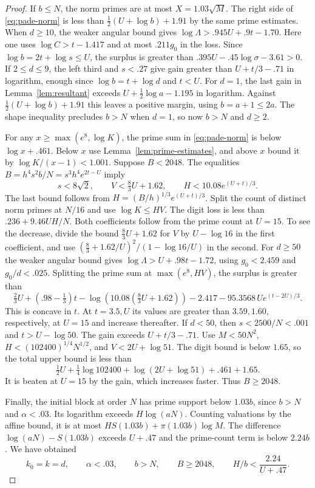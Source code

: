 \begin{proof}
If \(b\le N\), the norm primes are at most \(X=1.03\sqrt M\).
The right side of \eqref{eq:pade-norm} is less than
\(\tfrac12(U+\log b)+1.91\) by the same prime estimates.
When \(d\ge10\), the weaker angular bound gives
\(\log\Lambda>.945U+.9t-1.70\). Here one uses
\(\log C>t-1.417\) and at most \(.211g_0\) in the loss.
Since \(\log b=2t+\log s\le U\), the surplus is greater than
\(.395U-.45\log\sigma-3.61>0\).
If \(2\le d\le9\), the left third and \(s<.27\) give gain
greater than \(U+t/3-.71\) in logarithm, enough since
\(\log b=t+\log d\) and \(t<U\).
For \(d=1\), the last gain in Lemma~\ref{lem:resultant}
exceeds \(U+\tfrac12\log a-1.195\) in logarithm.
Against \(\tfrac12(U+\log b)+1.91\) this leaves a positive
margin, using \(b=a+1\le2a\). The shape inequality precludes
\(b>N\) when \(d=1\), so now \(b>N\) and \(d\ge2\).

For any \(x\ge\max(e^8,\log K)\), the prime sum in
\eqref{eq:pade-norm} is below \(\log x+.461\). Below \(x\)
use Lemma~\ref{lem:prime-estimates}, and above \(x\) bound it
by \(\log K/(x-1)<1.001\).
Suppose \(B<2048\). The equalities
\(B=h^4s^2 b/N=s^3 h^4e^{2t-U}\) imply
\[
 s<8\sqrt2,\qquad V<\tfrac83U+1.62,\qquad
 H<10.08e^{(U+t)/3}.
\]
The last bound follows from \(H=(B/h)^{1/3}e^{(U+t)/3}\).
Split the count of distinct norm primes at \(N/16\)
and use \(\log K\le HV\). The digit loss is less than
\(.236+9.46UH/N\). Both coefficients follow from the prime count at \(U=15\).
To see the decrease, divide the bound \(\tfrac83U+1.62\)
for \(V\) by \(U-\log16\) in the first coefficient, and use
\((\tfrac83+1.62/U)^2/(1-\log16/U)\) in the second.
For \(d\ge50\) the weaker angular bound gives
\(\log\Lambda>U+.98t-1.72\), using \(g_0<2.459\)
and \(g_0/d<.025\).
Splitting the prime sum at \(\max(e^8,HV)\), the surplus is
greater than
\[
 \tfrac23 U+(.98-\tfrac13)t
 -\log(10.08(\tfrac83 U+1.62))-2.417
 -95.3568\,Ue^{(t-2U)/3}.
\]
This is concave in \(t\). At \(t=3.5,U\) its values are
greater than \(3.59,1.60\), respectively, at \(U=15\)
and increase thereafter. If \(d<50\), then \(s<2500/N<.001\)
and \(t>U-\log50\). The gain exceeds \(U+t/3-.71\).
Use \(M<50N^2\), \(H<(102400)^{1/4}N^{1/2}\), and
\(V<2U+\log51\). The digit bound is below \(1.65\), so
the total upper bound is less than
\[
 \tfrac12U+\tfrac14\log102400+\log(2U+\log51)+.461+1.65.
\]
It is beaten at \(U=15\) by the gain, which increases faster.
Thus \(B\ge2048\).

Finally, the initial block at order \(N\) has prime support
below \(1.03b\), since \(b>N\) and \(\alpha<.03\).
Its logarithm exceeds \(H\log(aN)\). Counting valuations
by the affine bound, it is at most
\(H S(1.03b)+\pi(1.03b)\log M\).
The difference \(\log(aN)-S(1.03b)\) exceeds \(U+.47\)
and the prime-count term is below \(2.24b\). We have obtained
\begin{equation}\label{eq:large-parameter-range}
 k_0=k=d,\qquad \alpha<.03,\qquad b>N,\qquad
 B\ge2048,\qquad H/b<\frac{2.24}{U+.47}.
\end{equation}


\end{proof}
